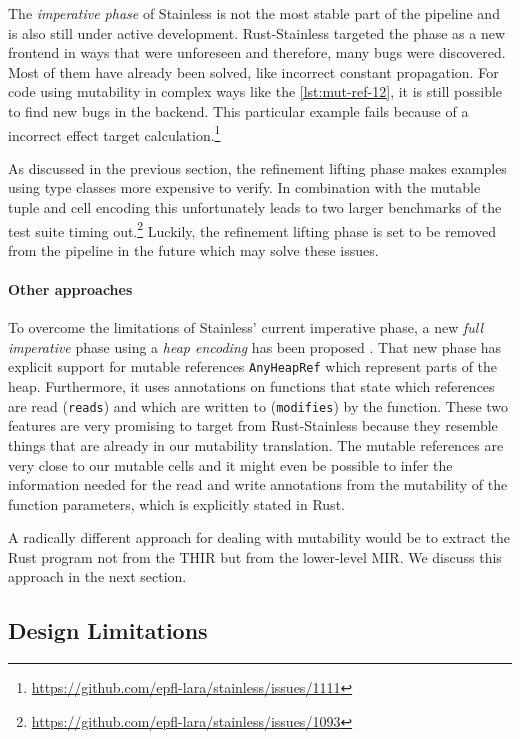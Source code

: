 The \emph{imperative phase} of Stainless is not the most stable part of the
pipeline and is also still under active development. Rust-Stainless targeted the
phase as a new frontend in ways that were unforeseen and therefore, many bugs
were discovered. Most of them have already been solved, like incorrect constant
propagation. For code using mutability in complex ways like the
\autoref{lst:mut-ref-12}, it is still possible to find new bugs in the backend.
This particular example fails because of a incorrect effect target
calculation.\footnote{\url{https://github.com/epfl-lara/stainless/issues/1111}}

As discussed in the previous section, the refinement lifting phase makes
examples using type classes more expensive to verify. In combination with the
mutable tuple and cell encoding this unfortunately leads to two larger
benchmarks of the test suite timing
out.\footnote{\url{https://github.com/epfl-lara/stainless/issues/1093}} Luckily,
the refinement lifting phase is set to be removed from the pipeline in the
future which may solve these issues.

\paragraph{Other approaches}

To overcome the limitations of Stainless' current imperative phase, a
new \emph{full imperative} phase using a \emph{heap encoding} has been
proposed \cite{new-imperative}. That new phase has explicit support for
mutable references \passthrough{\lstinline!AnyHeapRef!} which represent
parts of the heap. Furthermore, it uses annotations on functions that
state which references are read (\passthrough{\lstinline!reads!}) and
which are written to (\passthrough{\lstinline!modifies!}) by the
function. These two features are very promising to target from
Rust-Stainless because they resemble things that are already in our
mutability translation. The mutable references are very close to our
mutable cells and it might even be possible to infer the information
needed for the read and write annotations from the mutability of the
function parameters, which is explicitly stated in Rust.

A radically different approach for dealing with mutability would be to
extract the Rust program not from the THIR but from the lower-level MIR.
We discuss this approach in the next section.

\subsection{Design Limitations}

